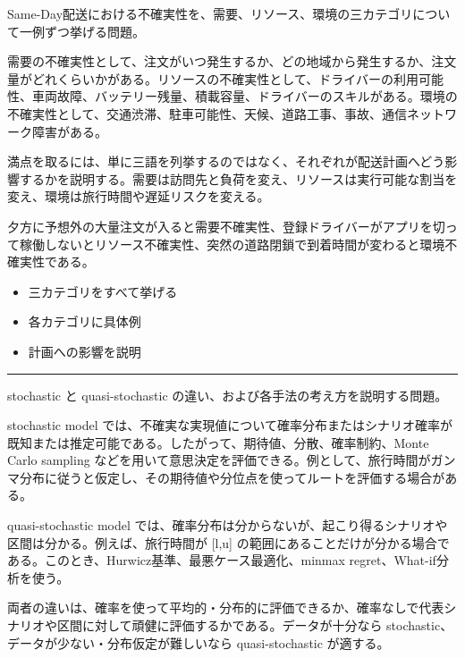 \clearpage
{}
Same-Day配送における不確実性を、需要、リソース、環境の三カテゴリについて一例ずつ挙げる問題。\par
{}
需要の不確実性として、注文がいつ発生するか、どの地域から発生するか、注文量がどれくらいかがある。リソースの不確実性として、ドライバーの利用可能性、車両故障、バッテリー残量、積載容量、ドライバーのスキルがある。環境の不確実性として、交通渋滞、駐車可能性、天候、道路工事、事故、通信ネットワーク障害がある。\par
満点を取るには、単に三語を列挙するのではなく、それぞれが配送計画へどう影響するかを説明する。需要は訪問先と負荷を変え、リソースは実行可能な割当を変え、環境は旅行時間や遅延リスクを変える。\par
{}
夕方に予想外の大量注文が入ると需要不確実性、登録ドライバーがアプリを切って稼働しないとリソース不確実性、突然の道路閉鎖で到着時間が変わると環境不確実性である。\par
{}
\begin{itemize}
\item 三カテゴリをすべて挙げる
\item 各カテゴリに具体例
\item 計画への影響を説明
\end{itemize}
\vspace{2mm}\hrule\vspace{2mm}
stochastic と quasi-stochastic の違い、および各手法の考え方を説明する問題。\par
{}
stochastic model では、不確実な実現値について確率分布またはシナリオ確率が既知または推定可能である。したがって、期待値、分散、確率制約、Monte Carlo sampling などを用いて意思決定を評価できる。例として、旅行時間がガンマ分布に従うと仮定し、その期待値や分位点を使ってルートを評価する場合がある。\par
quasi-stochastic model では、確率分布は分からないが、起こり得るシナリオや区間は分かる。例えば、旅行時間が [l,u] の範囲にあることだけが分かる場合である。このとき、Hurwicz基準、最悪ケース最適化、minmax regret、What-if分析を使う。\par
両者の違いは、確率を使って平均的・分布的に評価できるか、確率なしで代表シナリオや区間に対して頑健に評価するかである。データが十分なら stochastic、データが少ない・分布仮定が難しいなら quasi-stochastic が適する。\par
